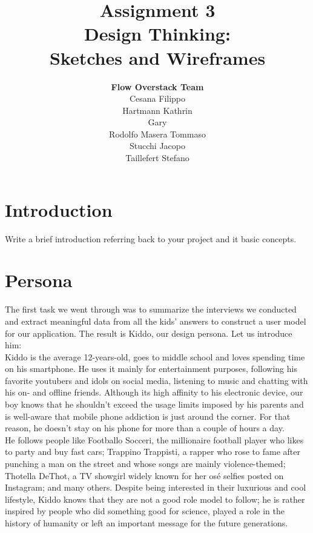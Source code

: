 \documentclass[12pt]{scrartcl}
\title{Assignment 3\\ Design Thinking:\\ Sketches and Wireframes}
\author{\textbf{Flow Overstack Team}\\ Cesana Filippo\\ Hartmann Kathrin\\ Gary\\ Rodolfo Masera Tommaso\\ Stucchi Jacopo\\ Taillefert Stefano}
\date{}
\begin{document}
\maketitle

\tableofcontents

\newpage


\section{Introduction}

	Write a brief introduction referring back to your project and it basic concepts.

\section{Persona}

	
	The first task we went through was to summarize the interviews we conducted and extract meaningful data from all the kids' 
	answers to construct a user model for our application. The result is Kiddo, our design persona. Let us introduce him:\\
	
	Kiddo is the average 12-years-old, goes to middle school and loves spending time on his smartphone. He uses it mainly for 
	entertainment purposes, following his favorite youtubers and idols on social media, listening to music and chatting with his on- 
	and offline friends. Although its high affinity to his electronic device, our boy knows that he shouldn't exceed the usage limits 
	imposed by his parents and is well-aware that mobile phone addiction is just around the corner. For that reason, he doesn't
	stay on his phone for more than a couple of hours a day.\\
	
	He follows people like Footballo Socceri, the millionaire football player who likes to party and buy fast cars; 
	Trappino Trappisti, a rapper who rose to fame after punching a man on the street and whose songs are mainly violence-themed;
	Thotella DeThot, a TV showgirl widely known for her osé selfies posted on Instagram; and many others. Despite being interested 
	in their luxurious and cool lifestyle, Kiddo knows that they are not a good role model to follow; he is rather inspired by people
	who did something good for science, played a role in the history of humanity or left an important message for the future
	generations.\\
	
\end{document}

